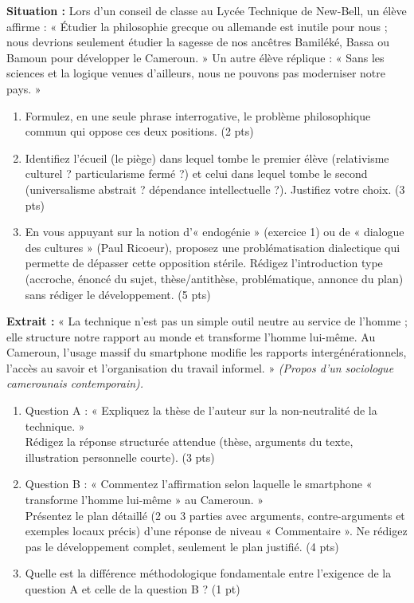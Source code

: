 \documentclass[11pt]{article}
\begin{document}
\begin{exercice}
\textbf{Situation :} Lors d'un conseil de classe au Lycée Technique de New-Bell, un élève affirme : « Étudier la philosophie grecque ou allemande est inutile pour nous ; nous devrions seulement étudier la sagesse de nos ancêtres Bamiléké, Bassa ou Bamoun pour développer le Cameroun. » Un autre élève réplique : « Sans les sciences et la logique venues d'ailleurs, nous ne pouvons pas moderniser notre pays. »

\begin{enumerate}
    \item Formulez, en une seule phrase interrogative, le problème philosophique commun qui oppose ces deux positions. (2 pts)
    \item Identifiez l'écueil (le piège) dans lequel tombe le premier élève (relativisme culturel ? particularisme fermé ?) et celui dans lequel tombe le second (universalisme abstrait ? dépendance intellectuelle ?). Justifiez votre choix. (3 pts)
    \item En vous appuyant sur la notion d'« endogénie » (exercice 1) ou de « dialogue des cultures » (Paul Ricoeur), proposez une problématisation dialectique qui permette de dépasser cette opposition stérile. Rédigez l'introduction type (accroche, énoncé du sujet, thèse/antithèse, problématique, annonce du plan) sans rédiger le développement. (5 pts)
\end{enumerate}
\end{exercice}

\begin{exercice}
\textbf{Extrait :} « La technique n'est pas un simple outil neutre au service de l'homme ; elle structure notre rapport au monde et transforme l'homme lui-même. Au Cameroun, l'usage massif du smartphone modifie les rapports intergénérationnels, l'accès au savoir et l'organisation du travail informel. » \textit{(Propos d'un sociologue camerounais contemporain).}

\begin{enumerate}
    \item Question A : « Expliquez la thèse de l'auteur sur la non-neutralité de la technique. » \\
    Rédigez la réponse structurée attendue (thèse, arguments du texte, illustration personnelle courte). (3 pts)
    \item Question B : « Commentez l'affirmation selon laquelle le smartphone « transforme l'homme lui-même » au Cameroun. » \\
    Présentez le plan détaillé (2 ou 3 parties avec arguments, contre-arguments et exemples locaux précis) d'une réponse de niveau « Commentaire ». Ne rédigez pas le développement complet, seulement le plan justifié. (4 pts)
    \item Quelle est la différence méthodologique fondamentale entre l'exigence de la question A et celle de la question B ? (1 pt)
\end{enumerate}
\end{exercice}
\end{document}
